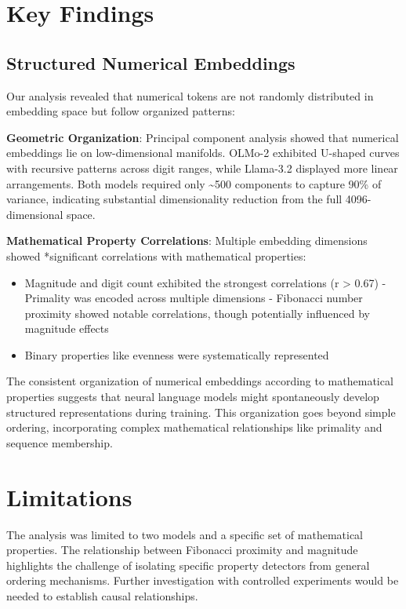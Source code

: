 \documentclass[
  a4paper, twoside, 10pt, titlepage]{book}
\providecommand{\tightlist}{%
  \setlength{\itemsep}{0pt}\setlength{\parskip}{0pt}}
\begin{document}
\section{Key Findings}\label{key-findings}

\subsection{Structured Numerical
Embeddings}\label{structured-numerical-embeddings}

Our analysis revealed that numerical tokens are not randomly distributed
in embedding space but follow organized patterns:

\textbf{Geometric Organization}: Principal component analysis showed
that numerical embeddings lie on low-dimensional manifolds. OLMo-2
exhibited U-shaped curves with recursive patterns across digit ranges,
while Llama-3.2 displayed more linear arrangements. Both models required
only \textasciitilde500 components to capture 90\% of variance,
indicating substantial dimensionality reduction from the full
4096-dimensional space.

\textbf{Mathematical Property Correlations}: Multiple embedding
dimensions showed *significant correlations with mathematical
properties:

\begin{itemize}
\tightlist
\item
  Magnitude and digit count exhibited the strongest correlations (r
  \textgreater{} 0.67) - Primality was encoded across multiple
  dimensions - Fibonacci number proximity showed notable correlations,
  though potentially influenced by magnitude effects
\item
  Binary properties like evenness were systematically represented
\end{itemize}

The consistent organization of numerical embeddings according to
mathematical properties suggests that neural language models might
spontaneously develop structured representations during training. This
organization goes beyond simple ordering, incorporating complex
mathematical relationships like primality and sequence membership.

\section{Limitations}\label{limitations}

The analysis was limited to two models and a specific set of
mathematical properties. The relationship between Fibonacci proximity
and magnitude highlights the challenge of isolating specific property
detectors from general ordering mechanisms. Further investigation with
controlled experiments would be needed to establish causal
relationships.
\end{document}
